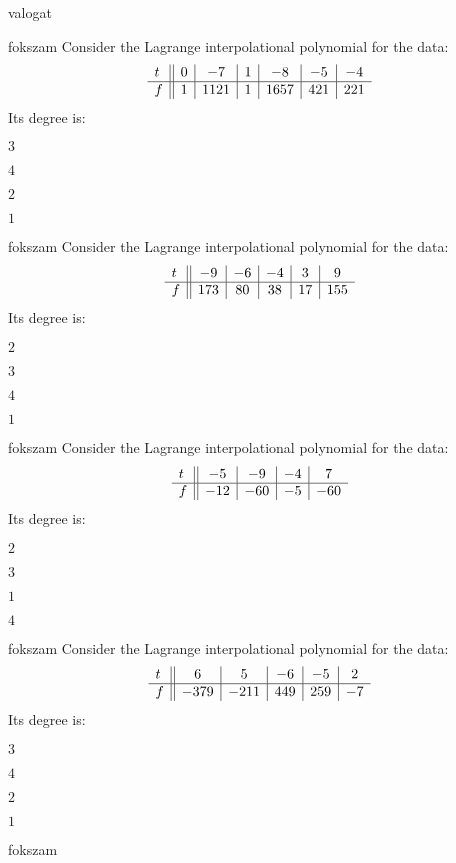 \documentclass[12pt]{article}
\begin{document}
\begin{quiz}{valogat}
\begin{multi}{fokszam}
Consider the Lagrange interpolational polynomial for the data:
$$\begin{array}{l ||c|c|c|c|c|c}t&0&-7&1&-8&-5&-4\\ \hline f&1&1121&1&1657&421&221 \\ \end{array}$$
Its degree is:
\item* $ 3 $
\item  $ 4 $
\item  $ 2 $
\item  $ 1 $
\end{multi}
\begin{multi}{fokszam}
Consider the Lagrange interpolational polynomial for the data:
$$\begin{array}{l ||c|c|c|c|c}t&-9&-6&-4&3&9\\ \hline f&173&80&38&17&155 \\ \end{array}$$
Its degree is:
\item* $ 2 $
\item  $ 3 $
\item  $ 4 $
\item  $ 1 $
\end{multi}
\begin{multi}{fokszam}
Consider the Lagrange interpolational polynomial for the data:
$$\begin{array}{l ||c|c|c|c}t&-5&-9&-4&7\\ \hline f&-12&-60&-5&-60 \\ \end{array}$$
Its degree is:
\item* $ 2 $
\item  $ 3 $
\item  $ 1 $
\item  $ 4 $
\end{multi}
\begin{multi}{fokszam}
Consider the Lagrange interpolational polynomial for the data:
$$\begin{array}{l ||c|c|c|c|c}t&6&5&-6&-5&2\\ \hline f&-379&-211&449&259&-7 \\ \end{array}$$
Its degree is:
\item* $ 3 $
\item  $ 4 $
\item  $ 2 $
\item  $ 1 $
\end{multi}
\begin{multi}{fokszam}

\end{multi}
\end{quiz}
\end{document}
